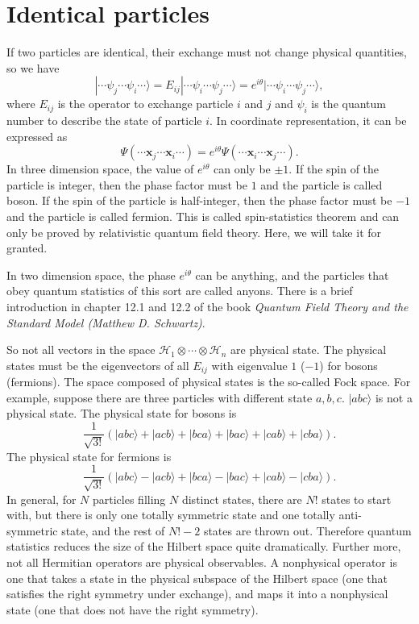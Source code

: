 \section{Identical particles}
If two particles are identical, their exchange must not change physical quantities, so we have
\[|\cdots\psi_j\cdots\psi_i\cdots\rangle = E_{ij}|\cdots\psi_i\cdots\psi_j\cdots\rangle = e^{i\theta} |\cdots\psi_i\cdots\psi_j\cdots\rangle,\]
where $E_{ij}$ is the operator to exchange particle $i$ and $j$ and $\psi_i$ is the quantum number to describe the state of particle $i$.
In coordinate representation, it can be expressed as
\[\Psi(\cdots\bm{x}_j\cdots\bm{x}_i\cdots) = e^{i\theta} \Psi(\cdots\bm{x}_i\cdots\bm{x}_j\cdots).\]
In three dimension space, the value of $e^{i\theta}$ can only be $\pm 1$. If the spin of the particle is integer, then the phase factor must be $1$ and the particle is called boson. If the spin of the particle is half-integer, then the phase factor must be $-1$ and the particle is called fermion. This is called spin-statistics theorem and can only be proved by relativistic quantum field theory. Here, we will take it for granted.
\begin{note}
In two dimension space, the phase $e^{i\theta}$ can be anything, and the particles that obey quantum statistics of this sort are called anyons. There is a brief introduction in chapter 12.1 and
12.2 of the book \emph{Quantum Field Theory and the Standard Model (Matthew D. Schwartz)}.
\end{note}
\noindent
So not all vectors in the space $\mathcal{H}_1\otimes\cdots\otimes\mathcal{H}_n$ are physical state. The physical states must be the eigenvectors of all $E_{ij}$ with eigenvalue $1$ ($-1$) for bosons (fermions). The space composed of physical states is the so-called Fock space. For example, suppose there are three particles with different state $a,b,c$. $|abc\rangle$ is not a physical state. The physical state for bosons is
\[\frac{1}{\sqrt{3!}} \left( |abc\rangle + |acb\rangle + |bca\rangle + |bac\rangle + |cab\rangle + |cba\rangle\right).\]
The physical state for fermions is
\[\frac{1}{\sqrt{3!}} \left( |abc\rangle - |acb\rangle + |bca\rangle - |bac\rangle + |cab\rangle - |cba\rangle\right).\]
In general, for $N$ particles filling $N$ distinct states, there are $N!$ states to start with, but there is only one totally symmetric state and one totally anti-symmetric state, and the rest of $N!-2$ states are thrown out. Therefore quantum statistics reduces the size of the Hilbert space quite dramatically.
Further more, not all Hermitian operators are physical observables. A nonphysical operator is one that takes a state in the physical subspace of the Hilbert space (one that satisfies the right symmetry under exchange), and maps it into a nonphysical state (one that does not have the right symmetry).
